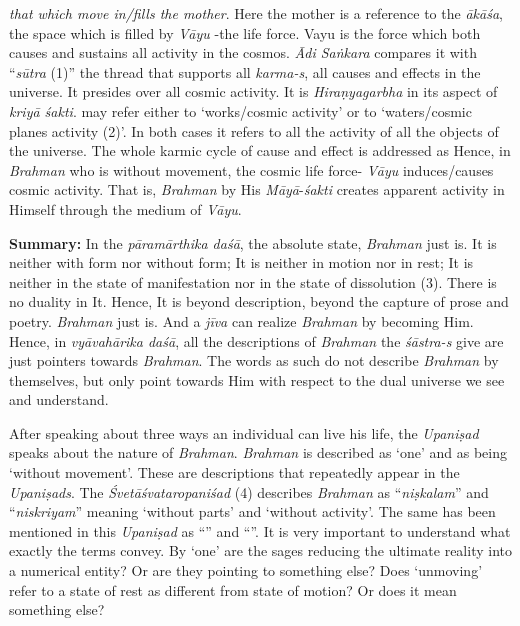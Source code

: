  \emph{that which move in/fills the mother}. Here the mother is a reference to the \emph{ākāśa}, the space which is filled by \emph{Vāyu} -the life force. Vayu is the force which both causes and sustains all activity in the cosmos. \emph{Ādi Saṅkara} compares it with ``\emph{sūtra} (1)'' the thread that supports all \emph{karma-s}, all causes and effects in the universe. It presides over all cosmic activity. It is \emph{Hiraṇyagarbha} in its aspect of \emph{kriyā śakti}.  may refer either to `works/cosmic activity' or to `waters/cosmic planes activity (2)'. In both cases it refers to all the activity of all the objects of the universe. The whole karmic cycle of cause and effect is addressed as  Hence, in \emph{Brahman} who is without movement, the cosmic life force- \emph{Vāyu} induces/causes cosmic activity. That is, \emph{Brahman} by His \emph{Māyā}-\emph{śakti} creates apparent activity in Himself through the medium of \emph{Vāyu}.

\textbf{Summary:} In the \emph{pāramārthika daśā}, the absolute state, \emph{Brahman} just is. It is neither with form nor without form; It is neither in motion nor in rest; It is neither in the state of manifestation nor in the state of dissolution (3). There is no duality in It. Hence, It is beyond description, beyond the capture of prose and poetry. \emph{Brahman} just is. And a \emph{jīva} can realize \emph{Brahman} by becoming Him. Hence, in \emph{vyāvahārika daśā}, all the descriptions of \emph{Brahman} the \emph{śāstra-s} give are just pointers towards \emph{Brahman}. The words as such do not describe \emph{Brahman} by themselves, but only point towards Him with respect to the dual universe we see and understand.

After speaking about three ways an individual can live his life, the \emph{Upaniṣad} speaks about the nature of \emph{Brahman}. \emph{Brahman} is described as `one' and as being `without movement'. These are descriptions that repeatedly appear in the \emph{Upaniṣads}. The \emph{Śvetāśvataropaniśad} (4) describes \emph{Brahman} as ``\emph{niṣkalam}'' and ``\emph{niskriyam}'' meaning `without parts' and `without activity'. The same has been mentioned in this \emph{Upaniṣad} as ``'' and ``''. It is very important to understand what exactly the terms convey. By `one' are the sages reducing the ultimate reality into a numerical entity? Or are they pointing to something else? Does `unmoving' refer to a state of rest as different from state of motion? Or does it mean something else?

